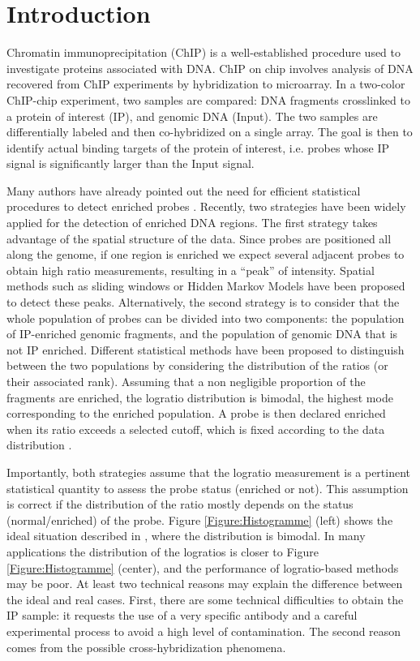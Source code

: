 \documentclass{bioinfo}
\begin{document}
\section{Introduction}
Chromatin immunoprecipitation (ChIP) is a well-established procedure
used to investigate proteins associated with DNA. ChIP on chip
involves analysis of DNA recovered from ChIP experiments by
hybridization to microarray. In a two-color ChIP-chip experiment, two
samples are compared: DNA fragments crosslinked to a protein of
interest (IP), and genomic DNA (Input). The two samples are
differentially labeled and then co-hybridized on a single array. The
goal is then to identify actual binding targets of the protein of
interest, i.e. probes whose IP signal is significantly larger than the
Input signal. {\par} Many authors have already pointed out the need
for efficient statistical procedures to detect enriched probes
\citep{BuckLieb04,Keles07}. Recently, two strategies have been widely
applied for the detection of enriched DNA regions. The first strategy
takes advantage of the spatial structure of the data. Since probes are
positioned all along the genome, if one region is enriched we expect
several adjacent probes to obtain high ratio measurements, resulting
in a ``peak'' of intensity. Spatial methods such as sliding windows
\citep{Cawley04,Keles07} or Hidden Markov Models
\citep{JiWong05,LiMeyerLiu05} have been proposed to detect these peaks.
Alternatively, the second strategy is to consider that the whole
population of probes can be divided into two components: the
population of IP-enriched genomic fragments, and the population of
genomic DNA that is not IP enriched. Different statistical methods
have been proposed to distinguish between the two populations by
considering the distribution of the ratios (or their associated rank).
Assuming that a non negligible proportion of the fragments are
enriched, the logratio distribution is bimodal, the highest mode
corresponding to the enriched population. A probe is then declared
enriched when its ratio exceeds a selected cutoff, which is fixed
according to the data distribution \citep{BuckLieb04}.  {\par}
Importantly, both strategies assume that the logratio measurement is a
pertinent statistical quantity to assess the probe status (enriched or
not). This assumption is correct if the distribution of the ratio
mostly depends on the status (normal/enriched) of the probe. Figure
\ref{Figure:Histogramme} (left) shows the ideal situation described in
\cite{BuckLieb04}, where the distribution is bimodal. In many
applications the distribution of the logratios is closer to Figure
\ref{Figure:Histogramme} (center), and the performance of
logratio-based methods may be poor. At least two technical reasons may
explain the difference between the ideal and real cases.
First, there are some technical difficulties to
obtain the IP sample: it requests the use of a very specific
antibody and a careful experimental process to avoid a high level of
contamination. The second reason comes from the possible cross-hybridization
phenomena.
\end{document}
